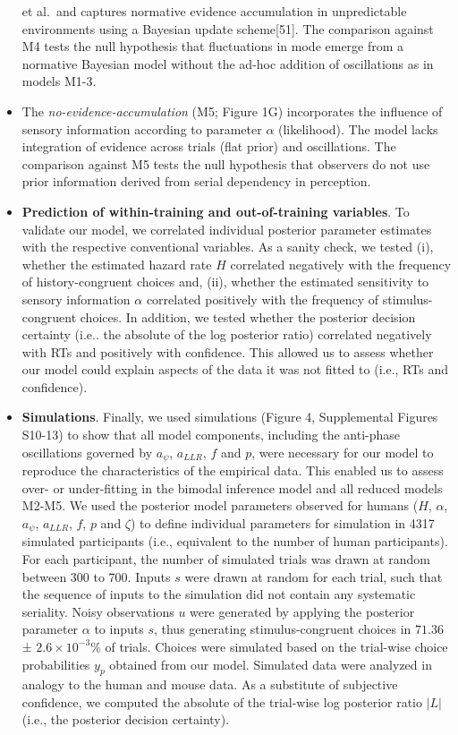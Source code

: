 \documentclass[
]{article}
\begin{document}
\begin{itemize}
  et al.~and captures normative evidence accumulation in unpredictable
  environments using a Bayesian update scheme{[}51{]}. The comparison
  against M4 tests the null hypothesis that fluctuations in mode emerge
  from a normative Bayesian model without the ad-hoc addition of
  oscillations as in models M1-3.
\item
  The \emph{no-evidence-accumulation} (M5; Figure 1G) incorporates the
  influence of sensory information according to parameter \(\alpha\)
  (likelihood). The model lacks integration of evidence across trials
  (flat prior) and oscillations. The comparison against M5 tests the
  null hypothesis that observers do not use prior information derived
  from serial dependency in perception.
\item
  \textbf{Prediction of within-training and out-of-training variables}.
  To validate our model, we correlated individual posterior parameter
  estimates with the respective conventional variables. As a sanity
  check, we tested (i), whether the estimated hazard rate \(H\)
  correlated negatively with the frequency of history-congruent choices
  and, (ii), whether the estimated sensitivity to sensory information
  \(\alpha\) correlated positively with the frequency of
  stimulus-congruent choices. In addition, we tested whether the
  posterior decision certainty (i.e.. the absolute of the log posterior
  ratio) correlated negatively with RTs and positively with confidence.
  This allowed us to assess whether our model could explain aspects of
  the data it was not fitted to (i.e., RTs and confidence).
\item
  \textbf{Simulations}. Finally, we used simulations (Figure 4,
  Supplemental Figures S10-13) to show that all model components,
  including the anti-phase oscillations governed by \(a_{\psi}\),
  \(a_{LLR}\), \(f\) and \(p\), were necessary for our model to
  reproduce the characteristics of the empirical data. This enabled us
  to assess over- or under-fitting in the bimodal inference model and
  all reduced models M2-M5. We used the posterior model parameters
  observed for humans (\(H\), \(\alpha\), \(a_{\psi}\), \(a_{LLR}\),
  \(f\), \(p\) and \(\zeta\)) to define individual parameters for
  simulation in 4317 simulated participants (i.e., equivalent to the
  number of human participants). For each participant, the number of
  simulated trials was drawn at random between 300 to 700. Inputs \(s\)
  were drawn at random for each trial, such that the sequence of inputs
  to the simulation did not contain any systematic seriality. Noisy
  observations \(u\) were generated by applying the posterior parameter
  \(\alpha\) to inputs \(s\), thus generating stimulus-congruent choices
  in \(71.36\) ± \(\ensuremath{2.6\times 10^{-3}}\)\% of trials. Choices
  were simulated based on the trial-wise choice probabilities \(y_{p}\)
  obtained from our model. Simulated data were analyzed in analogy to
  the human and mouse data. As a substitute of subjective confidence, we
  computed the absolute of the trial-wise log posterior ratio \(|L|\)
  (i.e., the posterior decision certainty).
\end{itemize}
\end{document}

